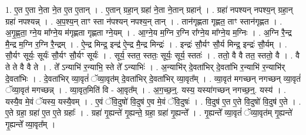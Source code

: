 \documentclass[17pt]{extarticle}
\begin{document}
1. ए॒त ए॒ता ने॒ता ने॒त ए॒त ए॒तान् । . ए॒तान् ग्रहा॒न् ग्रहा॑ ने॒ता ने॒तान् ग्रहान्॑ । . ग्रहा॑ नपश्यन् नपश्य॒न् ग्रहा॒न् ग्रहा॑ नपश्यन्न् । . अ॒प॒श्य॒न् ताꣳ स्ता न॑पश्यन् नपश्य॒न् तान् । . तान॑गृह्णता गृह्णत॒ ताꣳ स्तान॑गृह्णत । . अ॒गृ॒ह्ण॒ता॒ ग्ने॒य मा᳚ग्ने॒य म॑गृह्णता गृह्णता ग्ने॒यम् । . आ॒ग्ने॒य म॒ग्नि र॒ग्नि रा᳚ग्ने॒य मा᳚ग्ने॒य म॒ग्निः । . अ॒ग्नि रै॒न्द्र मै॒न्द्र म॒ग्नि र॒ग्नि रै॒न्द्रम् । . ऐ॒न्द्र मिन्द्र॒ इन्द्र॑ ऐ॒न्द्र मै॒न्द्र मिन्द्रः॑ । . इन्द्रः॑ सौ॒र्यꣳ सौ॒र्य मिन्द्र॒ इन्द्रः॑ सौ॒र्यम् । . सौ॒र्यꣳ सूर्यः॒ सूर्यः॑ सौ॒र्यꣳ सौ॒र्यꣳ सूर्यः॑ । . सूर्य॒ स्तत॒ स्ततः॒ सूर्यः॒ सूर्य॒ स्ततः॑ । . ततो॒ वै वै तत॒ स्ततो॒ वै । . वै ते ते वै वै ते । . ते᳚ ऽन्याभि॑ र॒न्याभि॒ स्ते ते᳚ ऽन्याभिः॑ । . अ॒न्याभि॑र् दे॒वता॑भिर् दे॒वता॑भि र॒न्याभि॑ र॒न्याभि॑र् दे॒वता॑भिः । . दे॒वता॑भिर् व्या॒वृतं॑ ॅव्या॒वृत॑म् दे॒वता॑भिर् दे॒वता॑भिर् व्या॒वृत᳚म् । . व्या॒वृत॑ मगच्छन् नगच्छन् व्या॒वृतं॑ ॅव्या॒वृत॑ मगच्छन्न् । . व्या॒वृत॒मिति॑ वि - आ॒वृत᳚म् । . अ॒ग॒च्छ॒न्॒. यस्य॒ यस्या॑गच्छन् नगच्छ॒न्॒. यस्य॑ । . यस्यै॒व मे॒वं ॅयस्य॒ यस्यै॒वम् । . ए॒वं ॅवि॒दुषो॑ वि॒दुष॑ ए॒व मे॒वं ॅवि॒दुषः॑ । . वि॒दुष॑ ए॒त ए॒ते वि॒दुषो॑ वि॒दुष॑ ए॒ते । . ए॒ते ग्रहा॒ ग्रहा॑ ए॒त ए॒ते ग्रहाः᳚ । . ग्रहा॑ गृ॒ह्यन्ते॑ गृ॒ह्यन्ते॒ ग्रहा॒ ग्रहा॑ गृ॒ह्यन्ते᳚ । . गृ॒ह्यन्ते᳚ व्या॒वृतं॑ ॅव्या॒वृत॑म् गृ॒ह्यन्ते॑ गृ॒ह्यन्ते᳚ व्या॒वृत᳚म् । \newline
\end{document}
